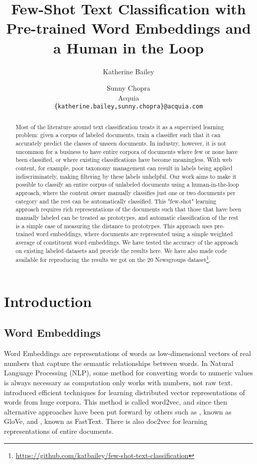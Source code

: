 \documentclass{article} %
\title{Few-Shot Text Classification with Pre-trained Word Embeddings and a Human in the Loop}
\author{Katherine Bailey \and Sunny Chopra \\
  Acquia \\
  \texttt{\{katherine.bailey,sunny.chopra\}@acquia.com}
}
\date{}
\begin{document}
\maketitle

\begin{abstract}
Most of the literature around text classification treats it as a supervised learning problem: given a corpus of labeled documents, train a classifier such that it can accurately predict the classes of unseen documents. In industry, however, it is not uncommon for a business to have entire corpora of documents where few or none have been classified, or where existing classifications have become meaningless. With web content, for example, poor taxonomy management can result in labels being applied indiscriminately, making filtering by these labels unhelpful. Our work aims to make it possible to classify an entire corpus of unlabeled documents using a human-in-the-loop approach, where the content owner manually classifies just one or two documents per category and the rest can be automatically classified. This "few-shot" learning approach requires rich representations of the documents such that those that have been manually labeled can be treated as prototypes, and automatic classification of the rest is a simple case of measuring the distance to prototypes. This approach uses pre-trained word embeddings, where documents are represented using a simple weighted average of constituent word embeddings. We have tested the accuracy of the approach on existing labeled datasets and provide the results here. We have also made code available for reproducing the results we got on the 20 Newsgroups dataset\footnote{\url{https://github.com/katbailey/few-shot-text-classification}}.
\end{abstract}

\section{Introduction}

\subsection*{Word Embeddings}

Word Embeddings are representations of words as low-dimensional vectors of real numbers that capture the semantic relationships between words. In Natural Language Processing (NLP), some method for converting words to numeric values is always necessary as computation only works with numbers, not raw text. \citep{mikolov2013distributed} introduced efficient techniques for learning distributed vector representations of words from huge corpora. This method is called word2vec, and since then alternative approaches have been put forward by others such as \citep{pennington2014glove}, known as GloVe, and \citep{bojanowski2016subword}, known as FastText. There is also doc2vec for learning representations of entire documents.
\end{document}

